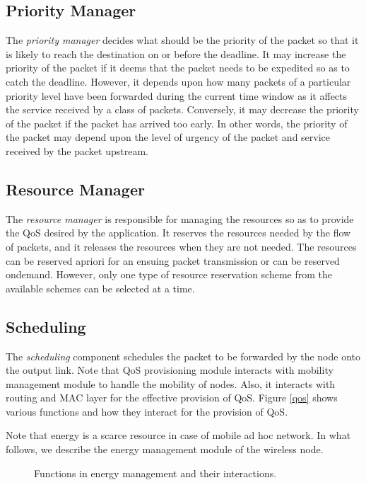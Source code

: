 \documentclass[10pt,times,epsfig,psfig,twocolumn,algorithm,algorithmic]{IEEEtran}
\begin{document}
\subsection{Priority Manager}
The {\em priority manager} decides what should be the priority of the packet so that it is likely to reach the destination on or before the deadline. It may increase the priority of the packet if it deems that the packet needs to be expedited so as to catch the deadline. However, it depends upon how many packets of a particular priority level have been forwarded during the current time window as it affects the service received by a class of packets. Conversely, it may decrease the priority of the packet if the packet has arrived too early. In other words, the priority of the packet may depend upon the level of urgency of the packet and service received by the packet upstream. 

\subsection{Resource Manager}
The {\em resource manager} is responsible for managing the resources so as to provide the QoS desired by the application. It reserves the resources needed by the flow of packets, and it releases the resources when they are not needed. The resources can be reserved apriori for an ensuing packet transmission or can be reserved ondemand. However, only one type of resource reservation scheme from the available schemes can be selected at a time.   

\subsection{Scheduling}
The {\em scheduling} component schedules the packet to be forwarded by the node onto the output link. Note that QoS provisioning module interacts with mobility management module to handle the mobility of nodes. Also, it interacts with routing and MAC layer for the effective provision of QoS.  Figure \ref{qos} shows various functions and how they interact for the provision of QoS.

Note that energy is a scarce resource in case of mobile ad hoc network. In what follows, we describe the energy management module of the wireless node.

\begin{figure}
\centerline{}
\caption{Functions in energy management and their interactions.}
\label{energy-management}
\end{figure}
\end{document}
